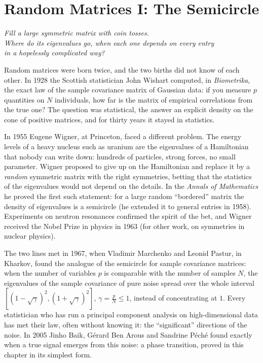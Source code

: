 \chapter{Random Matrices I: The Semicircle}\label{ch:semicircle}

\begin{center}\itshape
Fill a large symmetric matrix with coin tosses.\\
Where do its eigenvalues go, when each one depends on every entry\\
in a hopelessly complicated way?
\end{center}

Random matrices were born twice, and the two births did not know of each other. In 1928 the Scottish statistician John Wishart computed, in \emph{Biometrika}, the exact law of the sample covariance matrix of Gaussian data:
if you measure $p$ quantities on $N$ individuals, how far is the matrix of empirical correlations from the true one? The question was statistical, the answer an explicit density on the cone of positive matrices,
and for thirty years it stayed in statistics.

In 1955 Eugene Wigner, at Princeton, faced a different problem. The energy levels of a heavy nucleus such as uranium are the eigenvalues of a Hamiltonian that nobody can write down: hundreds of particles,
strong forces, no small parameter. Wigner proposed to give up on the Hamiltonian and replace it by a \emph{random} symmetric matrix with the right symmetries, betting that the statistics of the eigenvalues
would not depend on the details. In the \emph{Annals of Mathematics} he proved the first such statement: for a large random ``bordered'' matrix the density of eigenvalues is a semicircle (he extended it to general
entries in 1958). Experiments on neutron resonances confirmed the spirit of the bet, and Wigner received the Nobel Prize in physics in 1963 (for other work, on symmetries in nuclear physics).

The two lines met in 1967, when Vladimir Marchenko and Leonid Pastur, in Kharkov, found the analogue of the semicircle for sample covariance matrices: when the number of variables $p$ is comparable with the
number of samples $N$, the eigenvalues of the sample covariance of pure noise spread over the whole interval $[(1-\sqrt\gamma)^2,(1+\sqrt\gamma)^2]$, $\gamma=\frac pN\le1$, instead of concentrating at $1$. Every statistician who has
run a principal component analysis on high-dimensional data has met their law, often without knowing it: the ``significant'' directions of the noise. In 2005 Jinho Baik, G\'erard Ben Arous and Sandrine P\'ech\'e found
exactly when a true signal emerges from this noise: a phase transition, proved in this chapter in its simplest form.

